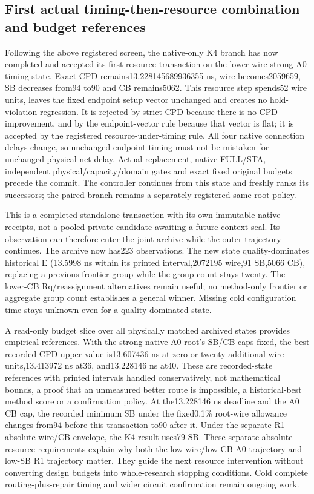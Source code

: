 \subsection{First actual timing-then-resource combination and budget references}
Following the above registered screen, the native-only K4 branch has now completed and accepted its first resource transaction on the lower-wire strong-A0 timing state. Exact CPD remains13.228145689936355 ns, wire becomes2059659, SB decreases from94 to90 and CB remains5062. This resource step spends52 wire units, leaves the fixed endpoint setup vector unchanged and creates no hold-violation regression. It is rejected by strict CPD because there is no CPD improvement, and by the endpoint-vector rule because that vector is flat; it is accepted by the registered resource-under-timing rule. All four native connection delays change, so unchanged endpoint timing must not be mistaken for unchanged physical net delay. Actual replacement, native FULL/STA, independent physical/capacity/domain gates and exact fixed original budgets precede the commit. The controller continues from this state and freshly ranks its successors; the paired branch remains a separately registered same-root policy.

This is a completed standalone transaction with its own immutable native receipts, not a pooled private candidate awaiting a future context seal. Its observation can therefore enter the joint archive while the outer trajectory continues. The archive now has223 observations. The new state quality-dominates historical E (13.5998 ns within its printed interval,2072195 wire,91 SB,5066 CB), replacing a previous frontier group while the group count stays twenty. The lower-CB Rq/reassignment alternatives remain useful; no method-only frontier or aggregate group count establishes a general winner. Missing cold configuration time stays unknown even for a quality-dominated state.

A read-only budget slice over all physically matched archived states provides empirical references. With the strong native A0 root's SB/CB caps fixed, the best recorded CPD upper value is13.607436 ns at zero or twenty additional wire units,13.413972 ns at36, and13.228146 ns at40. These are recorded-state references with printed intervals handled conservatively, not mathematical bounds, a proof that an unmeasured better route is impossible, a historical-best method score or a confirmation policy. At the13.228146 ns deadline and the A0 CB cap, the recorded minimum SB under the fixed0.1\% root-wire allowance changes from94 before this transaction to90 after it. Under the separate R1 absolute wire/CB envelope, the K4 result uses79 SB. These separate absolute resource requirements explain why both the low-wire/low-CB A0 trajectory and low-SB R1 trajectory matter. They guide the next resource intervention without converting design budgets into whole-research stopping conditions. Cold complete routing-plus-repair timing and wider circuit confirmation remain ongoing work.
